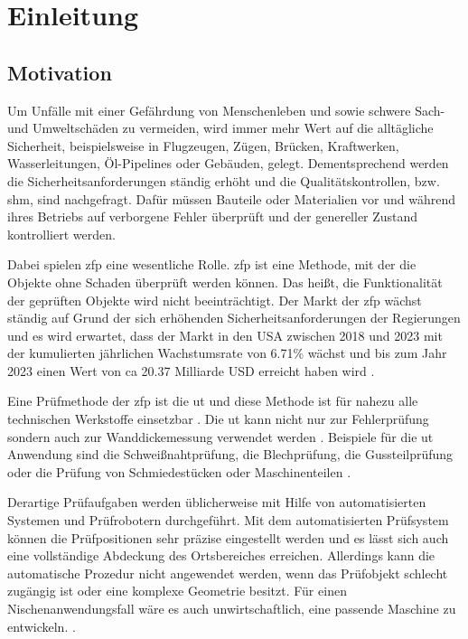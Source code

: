 \chapter{Einleitung} \label{chap:intro}

\section{Motivation} \label{sec:motivation}
Um Unfälle mit einer Gefährdung von Menschenleben und sowie schwere Sach- und Umweltschäden zu vermeiden, wird immer mehr Wert auf die alltägliche Sicherheit, beispielsweise in Flugzeugen, Zügen, Brücken, Kraftwerken, Wasserleitungen, Öl-Pipelines oder Gebäuden, gelegt. Dementsprechend werden die Sicherheitsanforderungen ständig erhöht und die Qualitätskontrollen, bzw. \acrfull{shm}, sind nachgefragt. Dafür müssen Bauteile oder Materialien vor und während ihres Betriebs auf verborgene Fehler überprüft und der genereller Zustand kontrolliert werden\cite{DGZfPintro}. \par
Dabei spielen \acrfull{zfp} eine wesentliche Rolle. \acrshort{zfp} ist eine Methode, mit der die Objekte ohne Schaden überprüft werden können. Das heißt, die Funktionalität der geprüften Objekte wird nicht beeinträchtigt. Der Markt der \acrshort{zfp} wächst ständig auf Grund der sich erhöhenden Sicherheitsanforderungen der Regierungen und es wird erwartet, dass der Markt in den USA zwischen 2018 und 2023 mit der kumulierten jährlichen Wachstumsrate von 6.71\% wächst und bis zum Jahr 2023 einen Wert von ca 20.37 Milliarde USD erreicht haben wird \cite{NDTindustrialreport}. \par  
Eine Prüfmethode der \acrshort{zfp} ist die \acrfull{ut} und diese Methode ist für nahezu alle technischen Werkstoffe einsetzbar \cite{Erhard07ZfPAufgaben}. Die \acrshort{ut} kann nicht nur zur Fehlerprüfung sondern auch zur Wanddickemessung verwendet werden \cite{WSPraktikumUS1}. Beispiele für die \acrshort{ut} Anwendung sind die Schweißnahtprüfung, die Blechprüfung,  die Gussteilprüfung oder die Prüfung von Schmiedestücken oder Maschinenteilen \cite{WSPraktikumUS1}. \par
Derartige Prüfaufgaben werden üblicherweise mit Hilfe von automatisierten Systemen und Prüfrobotern durchgeführt. Mit dem automatisierten Prüfsystem können die Prüfpositionen sehr präzise eingestellt werden und  es lässt sich auch eine vollständige Abdeckung des Ortsbereiches erreichen. Allerdings kann die automatische Prozedur nicht angewendet werden, wenn das Prüfobjekt schlecht zugängig ist oder eine komplexe Geometrie besitzt. Für einen Nischenanwendungsfall wäre es auch unwirtschaftlich, eine passende Maschine zu entwickeln. \cite{Krieg18SAFTwithSmartInspect}. \par
